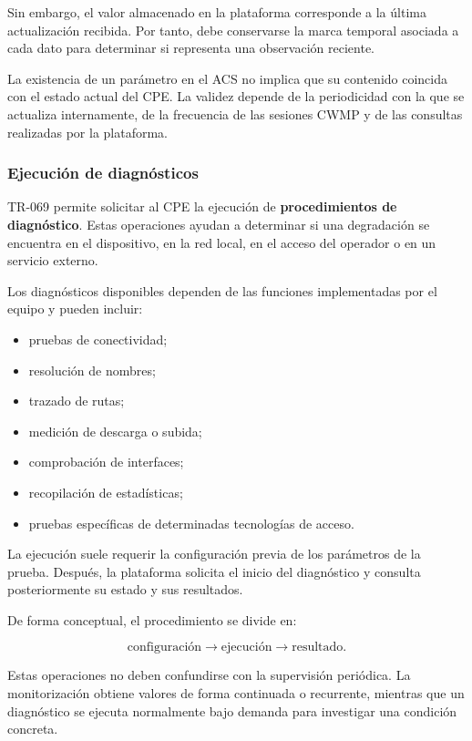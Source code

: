 Sin embargo, el valor almacenado en la plataforma corresponde a la
última actualización recibida. Por tanto, debe conservarse la marca
temporal asociada a cada dato para determinar si representa una
observación reciente.

La existencia de un parámetro en el ACS no implica que su contenido
coincida con el estado actual del CPE. La validez depende de la
periodicidad con la que se actualiza internamente, de la frecuencia de las
sesiones CWMP y de las consultas realizadas por la plataforma.


\subsubsection*{Ejecución de diagnósticos}

TR-069 permite solicitar al CPE la ejecución de
\textbf{procedimientos de diagnóstico}. Estas operaciones ayudan a
determinar si una degradación se encuentra en el dispositivo, en la red
local, en el acceso del operador o en un servicio externo.

Los diagnósticos disponibles dependen de las funciones implementadas por
el equipo y pueden incluir:

\begin{itemize}
    \item pruebas de conectividad;
    \item resolución de nombres;
    \item trazado de rutas;
    \item medición de descarga o subida;
    \item comprobación de interfaces;
    \item recopilación de estadísticas;
    \item pruebas específicas de determinadas tecnologías de acceso.
\end{itemize}

La ejecución suele requerir la configuración previa de los parámetros de
la prueba. Después, la plataforma solicita el inicio del diagnóstico y
consulta posteriormente su estado y sus resultados.

De forma conceptual, el procedimiento se divide en:

\[
    \text{configuración}
    \longrightarrow
    \text{ejecución}
    \longrightarrow
    \text{resultado}.
\]

Estas operaciones no deben confundirse con la supervisión periódica. La
monitorización obtiene valores de forma continuada o recurrente, mientras
que un diagnóstico se ejecuta normalmente bajo demanda para investigar
una condición concreta.


